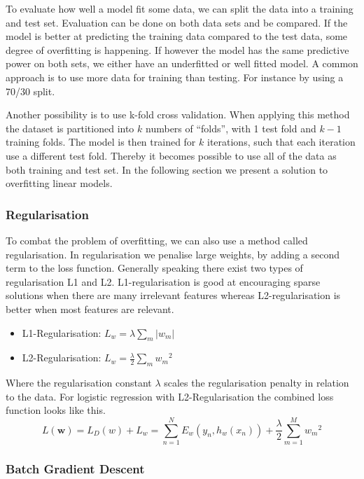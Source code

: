 To evaluate how well a model fit some data, we can split the data into a training and test set. Evaluation can be done on both data sets and be compared. If the model is better at predicting the training data compared to the test data, some degree of overfitting is happening. If however the model has the same predictive power on both sets, we either have an underfitted or well fitted model. A common approach is to use more data for training than testing. For instance by using a 70/30 split.

Another possibility is to use k-fold cross validation.
When applying this method the dataset is partitioned into $k$ numbers of ``folds'', with 1 test fold and $k-1$ training folds.
The model is then trained for $k$ iterations, such that each iteration use a different test fold.
Thereby it becomes possible to use all of the data as both training and test set. In the following section we present a solution to overfitting linear models.

\subsubsection{Regularisation}

To combat the problem of overfitting, we can also use a method called regularisation.
In regularisation we penalise large weights, by adding a second term to the loss function.
Generally speaking there exist two types of regularisation L1 and L2.
L1-regularisation is good at encouraging sparse solutions when there are many irrelevant features whereas L2-regularisation is better when most features are relevant.

\begin{itemize}
\item L1-Regularisation: $L_w = \lambda \sum_{m} \vert w_m \vert $
\item L2-Regularisation: $L_w = \frac{\lambda}{2} \sum_{m} {w_m}^2$
\end{itemize}

Where the regularisation constant $\lambda$ scales the regularisation penalty in relation to the data. For logistic regression with L2-Regularisation the combined loss function looks like this.
\[ L(\mathbf{w})
  = L_D(w) + L_w 
  = \sum_{n=1}^N E_w(y_n, h_w(x_n)) + \frac{\lambda}{2} \sum_{m=1}^{M} {w_m}^2 \] 

\subsubsection{Batch Gradient Descent}\label{sec:batch}


